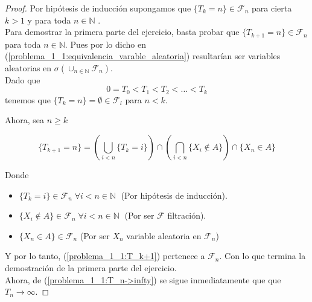 \begin{proof}
	Por hipótesis de inducción supongamos que $\{T_k = n\} \in \mathscr{F}_n$ para cierta $k>1$ 
	y para toda $n \in \mathbb{N}$ . \\

	Para demostrar la primera parte del ejercicio, basta probar que $\{T_{k+1} = n\} \in \mathscr{F}_n$ para 
	toda $n \in \mathbb{N}$. Pues por lo dicho en (\ref{problema_1_1:equivalencia_varable_aleatoria}) resultarían ser 
	variables aleatorias en $\sigma(\cup_{n \in \mathbb{N}} \mathscr{F}_n)$.
	\\
	
	Dado que 
	\begin{equation}\label{problema_1_1:T_n->infty}
		0=T_0<T_1<T_2<\dots<T_k
	\end{equation}  
	tenemos que $\{ T_k = n\} = \emptyset \in \mathscr{F}_l$ para $n < k$. 
	
	Ahora, sea $n \geq k$
	
	\begin{equation}\label{problema_1_1:T_k+1}
		\{ T_{k+1} = n\} = 
		\left( \bigcup_{i < n } \{T_k = i \} \right) 
		\cap 
		\left( \bigcap_{i < n} \{ X_i \not\in A \} \right)
		\cap
		\{ X_n \in A\}
	\end{equation}
	
	
	Donde 
	\begin{itemize}
		\item	 $\{ T_k = i\} \in \mathscr{F}_n \; \forall i < n \in \mathbb{N} \; $ (Por hipótesis de inducción).	
		\item	 $\{ X_i \not \in A\} \in \mathscr{F}_n \; \forall i < n \in \mathbb{N} \;$ (Por ser $\mathscr{F}$ filtración).
		\item $\{ X_n \in A\} \in \mathscr{F}_n$ (Por ser $X_n$ variable aleatoria en $\mathscr{F}_n$)	
	\end{itemize}
	
	Y por lo tanto, (\ref{problema_1_1:T_k+1}) pertenece a $\mathscr{F}_n$. Con lo que termina la demostración de la primera parte del ejercicio.\\
	
	Ahora, de (\ref{problema_1_1:T_n->infty}) se sigue inmediatamente que que $T_n \rightarrow \infty$.
\end{proof}
